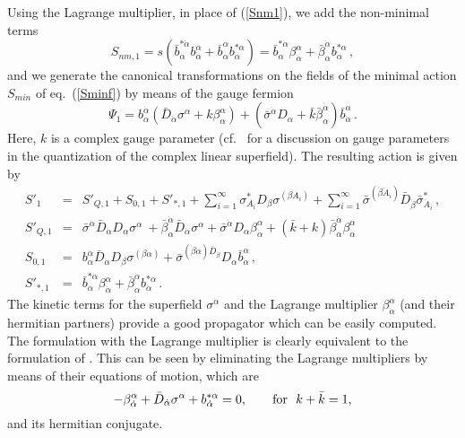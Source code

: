 \documentclass[a4paper,12pt]{article}
\begin{document}
Using the Lagrange multiplier, in place of (\ref{Snm1}), we add the
non-minimal terms
\begin{equation}
S_{nm,1}= s \left(  \bar b^{*\dot \alpha}_\alpha b^{\alpha}_{\dot \alpha} + 
\bar b^{\dot \alpha}_\alpha    b^{*\alpha}_{\dot \alpha}
\right) = \bar b^{*\dot \alpha}_\alpha \beta^{\alpha}_{\dot \alpha}  +  
\bar \beta^{\dot \alpha}_\alpha    b^{*\alpha}_{\dot \alpha}\,,  \label{nm1}
\end{equation}
and we generate the canonical transformations on the fields of the
minimal action $S_{min}$ of eq.~(\ref{Sminf}) by means of the gauge
fermion
\begin{equation}
\Psi_1= 
b_\alpha^{\dot \alpha} 
\left( \bar D_{\dot \alpha}\sigma^\alpha + k \beta^{\alpha}_{\dot
    \alpha} \right)  + 
\left( \bar \sigma^{\dot \alpha} 
 D_\alpha  + \bar k \bar \beta^{\dot
    \alpha}_\alpha \right) \bar b_{\dot \alpha}^\alpha \,. 
\label{Psi1_new}
\end{equation}
Here, $k$ is a complex gauge parameter (cf.~\cite{GPZ} for a
discussion on gauge parameters in the quantization of the complex
linear superfield). The resulting action is given by
\begin{eqnarray}
S'_1&=& S'_{Q,1}+S_{0,1}+S'_{*,1}+ 
\sum^{\infty}_{i=1}\sigma_{A_i}^* D_\beta \sigma^{(\beta A_i)} +  
\sum^{\infty}_{i= 1} \bar\sigma^{(\dot \beta \dot A_i)}  \bar D_{\dot
  \beta} \bar\sigma_{\dot A_i}^* 
\,, \nonumber\\
S'_{Q,1}&=&  
\bar\sigma^{\dot \alpha}\bar D_{\dot \alpha} D_\alpha\sigma^\alpha\ +
\bar \beta^{\dot \alpha}_\alpha \bar D_{\dot \alpha}\sigma^\alpha + 
\bar \sigma^{\dot \alpha} D_\alpha \beta_{\dot \alpha}^\alpha + 
\left( \bar k + k \right)  \bar \beta^{\dot \alpha}_\alpha
\beta^\alpha_{\dot \alpha} \\ 
S_{0,1}&=&
 b_\alpha^{\dot \alpha}\bar D_{\dot \alpha} D_\beta
\sigma^{(\beta\alpha)} + \bar\sigma^{(\dot\beta \dot\alpha) \bar
  D_{\dot\beta}} D_\alpha \bar b_{\dot\alpha}^\alpha \,,
\nonumber\\
S'_{*,1}&=&  \bar b^{*\dot \alpha}_\alpha \beta^{\alpha}_{\dot \alpha} +
\bar \beta^{\dot \alpha}_\alpha b^{*\alpha}_{\dot \alpha} \, .
\label{level1}
\end{eqnarray}
The kinetic terms for the superfield $\sigma^\alpha$ and the Lagrange
multiplier $\beta_{\dot \alpha}^{\alpha}$ (and their hermitian
partners) provide a good propagator which can be easily computed.  The
formulation with the Lagrange multiplier is clearly equivalent to the
formulation of \cite{GPZ}. This can be seen by eliminating the
Lagrange multipliers by means of their equations of motion, which are 
\begin{equation}
  \label{eq_lag_mul}
  - \beta^{\alpha}_{\dot \alpha} + \bar D_{\dot \alpha} \sigma^\alpha
  + b^{*\alpha}_{\dot \alpha} = 0,~~~~~~ {\rm for}~~ k  + \bar k =1,   
\end{equation}
and its hermitian conjugate. 
\end{document}

